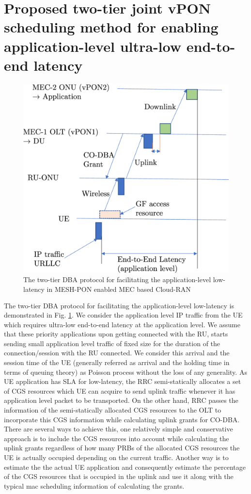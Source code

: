 \documentclass[a4paper, oneside, twocolumn, notitlepage, 10pt]{extarticle_ecoc}
\begin{document}
	\section{Proposed two-tier joint vPON scheduling method for enabling application-level ultra-low end-to-end latency} \label{sec:ProposedMethod}
	\begin{figure}[h]
		\includegraphics[clip, trim={0, 0, 0, 0}, width=\linewidth]{./Figures/DBAProtocol}
		\caption{The two-tier DBA protocol for facilitating the application-level low-latency in MESH-PON enabled MEC based Cloud-RAN}
		\label{fig:DBAProtocol}
	\end{figure}
	 The two-tier DBA protocol for facilitating the application-level low-latency is demonstrated in Fig. \ref{fig:DBAProtocol}. We consider the application level IP traffic from the UE which requires ultra-low end-to-end latency at the application level. We assume that these priority applications upon getting connected with the RU, starts sending small application level traffic of fixed size for the duration of the connection/session with the RU connected. We consider this arrival and the session time of the UE (generally referred as arrival and the holding time in terms of queuing theory) as Poisson process without the loss of any generality. As UE application has SLA for low-latency, the RRC semi-statically allocates a set of CGS resources which UE can acquire to send uplink traffic whenever it has application level packet to be transported. On the other hand, RRC passes the information of the semi-statically allocated CGS resources to the OLT to incorporate this CGS information while calculating uplink grants for CO-DBA. There are several ways to achieve this, one relatively simple and conservative approach is to include the CGS resources into account while calculating the uplink grants regardless of how many PRBs of the allocated CGS resources the UE is actually occupied depending on the current traffic. Another way is to estimate the the actual UE application and consequently estimate the percentage of the CGS resources that is occupied in the uplink and use it along with the typical mac scheduling information of calculating the grants.
	 
\end{document}
